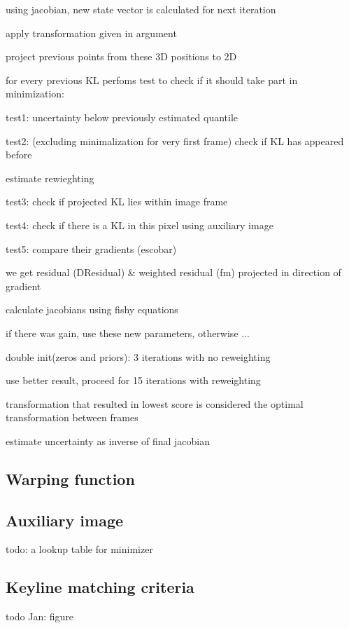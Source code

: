     using jacobian, new state vector is calculated for next iteration

    apply transformation given in argument

    project previous points from these 3D positions to 2D

    for every previous KL perfoms test to check if it should take part in minimization:

       test1: uncertainty below previously estimated quantile

	 test2: (excluding minimalization for very first frame) check if KL has appeared before

     estimate rewieghting

	 test3: check if projected KL lies within image frame

       test4: check if there is a KL in this pixel using auxiliary image

       test5: compare their gradients (escobar)

       we get residual (DResidual) \& weighted residual (fm) projected in direction of gradient

     calculate jacobians using fishy equations

     if there was gain, use these new parameters, otherwise ...

double init(zeros and priors): 3 iterations with no reweighting

use better result, proceed for 15 iterations with reweighting

transformation that resulted in lowest score is considered the optimal transformation between frames

estimate uncertainty as inverse of final jacobian

\subsection{Warping function}

\subsection{Auxiliary image}

todo: a lookup table for minimizer

\subsection{Keyline matching criteria}

todo Jan: figure

